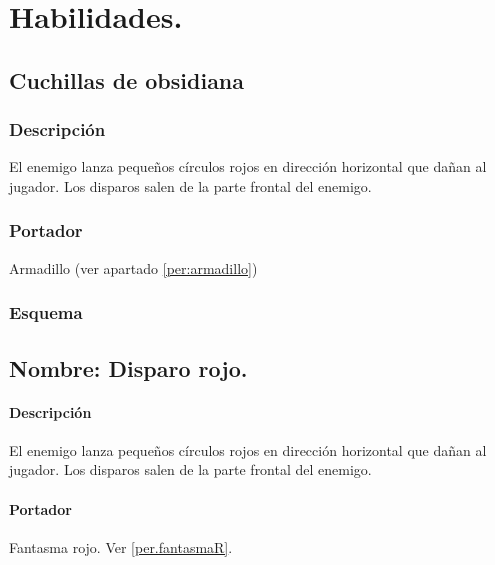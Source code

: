 \chapter{Habilidades.}
	\section{Cuchillas de obsidiana} \label{hab.CuchObs}	
		\subsection{Descripción}
		El enemigo lanza pequeños círculos rojos en dirección horizontal que dañan al jugador. Los disparos salen de la parte frontal del enemigo.
		\subsection{Portador}
		Armadillo (ver apartado \ref{per:armadillo})
		\subsection{Esquema}

		\section{Nombre: Disparo rojo.} \label{hab.disparoR}
		\subsubsection{Descripción}
		El enemigo lanza pequeños círculos rojos en dirección horizontal que dañan al jugador. Los disparos salen de la parte frontal del enemigo.
		\subsubsection{Portador}
		Fantasma rojo. Ver \ref{per.fantasmaR}.
